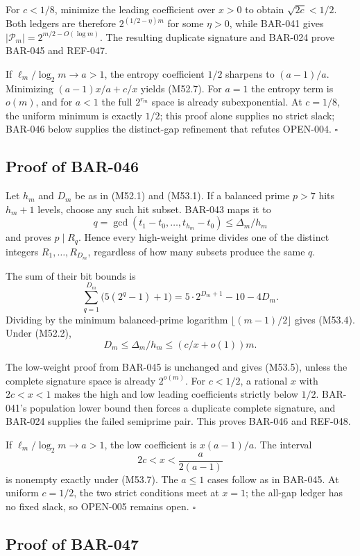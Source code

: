 \documentclass[11pt]{article}
\begin{document}
For \(c<1/8\), minimize the leading coefficient over \(x>0\) to obtain
\(\sqrt{2c}<1/2\). Both ledgers are therefore
\(2^{(1/2-\eta)m}\) for some \(\eta>0\), while BAR-041 gives
\(|\mathcal P_m|=2^{m/2-O(\log m)}\). The resulting duplicate signature
and BAR-024 prove BAR-045 and REF-047.

If \(\ell_m/\log_2m\to a>1\), the entropy coefficient \(1/2\) sharpens to
\((a-1)/a\). Minimizing
\((a-1)x/a+c/x\) yields (M52.7). For \(a=1\) the entropy term is
\(o(m)\), and for \(a<1\) the full \(2^{r_m}\) space is already
subexponential. At \(c=1/8\), the uniform minimum is exactly \(1/2\);
this proof alone supplies no strict slack; BAR-046 below supplies the
distinct-gap refinement that refutes OPEN-004. \(\square\)

\subsection{Proof of BAR-046}
\label{proof:BAR-046}

Let \(h_m\) and \(D_m\) be as in (M52.1) and (M53.1). If a balanced prime
\(p>7\) hits \(h_m+1\) levels, choose any such hit subset. BAR-043 maps it
to
\[
q=\gcd(t_1-t_0,\ldots,t_{h_m}-t_0)
\le\Delta_m/h_m
\]
and proves \(p\mid R_q\). Hence every high-weight prime divides one of the
distinct integers \(R_1,\ldots,R_{D_m}\), regardless of how many subsets
produce the same \(q\).

The sum of their bit bounds is
\[
\sum_{q=1}^{D_m}\bigl(5(2^q-1)+1\bigr)
=5\cdot2^{D_m+1}-10-4D_m.
\]
Dividing by the minimum balanced-prime logarithm
\(\lfloor(m-1)/2\rfloor\) gives (M53.4). Under (M52.2),
\[
D_m\le\Delta_m/h_m
\le(c/x+o(1))m.
\]

The low-weight proof from BAR-045 is unchanged and gives (M53.5), unless
the complete signature space is already \(2^{o(m)}\). For \(c<1/2\), a
rational \(x\) with \(2c<x<1\) makes the high and low leading coefficients
strictly below \(1/2\). BAR-041's population lower bound then forces a
duplicate complete signature, and BAR-024 supplies the failed semiprime pair.
This proves BAR-046 and REF-048.

If \(\ell_m/\log_2m\to a>1\), the low coefficient is
\(x(a-1)/a\). The interval
\[
2c<x<\frac{a}{2(a-1)}
\]
is nonempty exactly under (M53.7). The \(a\le1\) cases follow as in
BAR-045. At uniform \(c=1/2\), the two strict conditions meet at \(x=1\);
the all-gap ledger has no fixed slack, so OPEN-005 remains open. \(\square\)

\subsection{Proof of BAR-047}
\label{proof:BAR-047}
\end{document}
